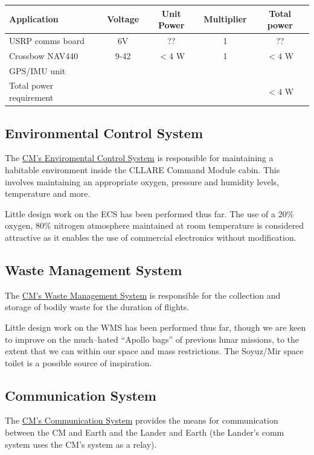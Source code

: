 \documentclass{report}
\begin{document}
\begin{tabular}{ | l | c | c | c | c | }
\hline
Application & Voltage & Unit Power & Multiplier & Total power \\
\hline
\hline
USRP comms board & 6V & ?? & 1 & ?? \\
\hline
Crossbow NAV440 & 9-42 & $<4$ W & 1 & $<4$ W \\
GPS/IMU unit & & & & \\
\hline
\hline
Total power requirement & & & & $<4$ W \\
\hline
\end{tabular}

\subsection{Environmental Control System}

The \href{http://cstart.org/wiki/CLLARE_Environmental_Control_System}{CM's Enviromental Control System} is responsible for maintaining a habitable environment inside the CLLARE Command Module cabin. This involves maintaining an appropriate oxygen, pressure and humidity levels, temperature and more.

Little design work on the ECS has been performed thus far.  The use of a 20\% oxygen, 80\% nitrogen atmosphere maintained at room temperature is considered attractive as it enables the use of commercial electronics without modification.

\subsection{Waste Management System}

The \href{http://cstart.org/wiki/CLLARE_Waste_Management_System}{CM's Waste Management System} is responsible for the collection and storage of bodily waste for the duration of flights.

Little design work on the WMS has been performed thus far, though we are keen to improve on the much--hated ``Apollo bags'' of previous lunar missions, to the extent that we can within our space and mass restrictions.  The Soyuz/Mir space toilet is a possible source of inspiration.

\subsection{Communication System}

The \href{http://cstart.org/wiki/CLLARE_CM_Communication_System}{CM's Communication System} provides the means for communication between the CM and Earth and the Lander and Earth (the Lander's comm system uses the CM's system as a relay).
\end{document}
